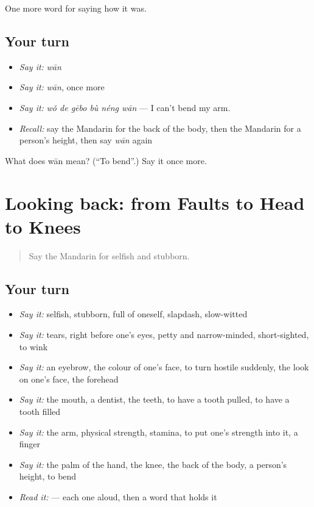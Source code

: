 \begin{grammarlens}[title={What you've built}]
One more word for saying how it was.
\end{grammarlens}

\subsection*{Your turn}
\begin{itemize}
\raggedright
  \item \emph{Say it:} \emph{wān}
  \item \emph{Say it:} \emph{wān}, once more
  \item \emph{Say it:} \emph{wǒ de gēbo bù néng wān} — I can't bend my arm.
  \item \emph{Recall:} say the Mandarin for the back of the body, then the Mandarin for a person's height, then say \emph{wān} again
\end{itemize}

\begin{tcolorbox}[breakable,colback=teal!4,colframe=teal!35!black,title={Before you move on}]
What does wān mean? (\textquotedblleft{}To bend\textquotedblright{}.) Say it once more.
\end{tcolorbox}
\section[(dialogue)]{Looking back: from Faults to Head to Knees}

\label{lesson:ZH-R475-review-470-475}



\begin{quote}
Say the Mandarin for selfish and stubborn.
\end{quote}

\subsection*{Your turn}
\begin{itemize}
\raggedright
  \item \emph{Say it:} selfish, stubborn, full of oneself, slapdash, slow-witted
  \item \emph{Say it:} tears, right before one's eyes, petty and narrow-minded, short-sighted, to wink
  \item \emph{Say it:} an eyebrow, the colour of one's face, to turn hostile suddenly, the look on one's face, the forehead
  \item \emph{Say it:} the mouth, a dentist, the teeth, to have a tooth pulled, to have a tooth filled
  \item \emph{Say it:} the arm, physical strength, stamina, to put one's strength into it, a finger
  \item \emph{Say it:} the palm of the hand, the knee, the back of the body, a person's height, to bend
  \item \emph{Read it:}     — each one aloud, then a word that holds it
\end{itemize}

